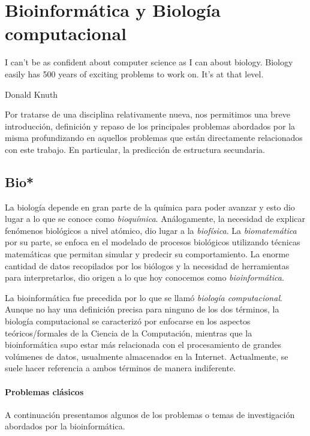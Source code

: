 \chapter{Bioinform\'atica y Biolog\'ia computacional}
\label{bioinformatica}
\epigraph{I can't be as confident about computer science as I can about biology.
Biology easily has 500 years of exciting problems to work on. It's at that
level.}%
{Donald Knuth}

Por tratarse de una disciplina relativamente nueva, nos permitimos una breve
introducci\'on, definici\'on y repaso de los principales problemas abordados
por la misma profundizando en aquellos problemas que est\'an directamente
relacionados con este trabajo. En particular, la predicci\'on de estructura
secundaria.

\section{Bio*}

La biolog\'ia depende en gran parte de la qu\'imica para poder avanzar y esto
dio lugar a lo que se conoce como \textit{bioqu\'imica}. An\'alogamente, la
necesidad de explicar fen\'omenos biol\'ogicos a nivel at\'omico, dio lugar a la
\textit{biof\'isica}. La \textit{biomatem\'atica} por su parte, se enfoca en el
modelado de procesos biol\'ogicos utilizando t\'ecnicas matem\'aticas que
permitan simular y predecir su comportamiento. La enorme cantidad de datos
recopilados por los bi\'ologos y la necesidad de herramientas para
interpretarlos, dio origen a lo que hoy conocemos como
\textit{bioinform\'atica}.

La bioinform\'atica fue precedida por lo que se llam\'o \textit{biolog\'ia
computacional}. Aunque no hay una definici\'on precisa para ninguno de
los dos t\'erminos, la biolog\'ia computacional se caracteriz\'o por enfocarse
en los aspectos te\'oricos/formales de la Ciencia de la Computaci\'on,
mientras que la bioinform\'atica supo estar m\'as relacionada con el
procesamiento de grandes vol\'umenes de datos, usualmente almacenados en la
Internet. Actualmente, se suele hacer referencia a ambos t\'erminos de manera
indiferente.

\subsubsection{Problemas cl\'asicos}

A continuaci\'on presentamos algunos de los problemas o temas de investigaci\'on
abordados por la bioinform\'atica.

